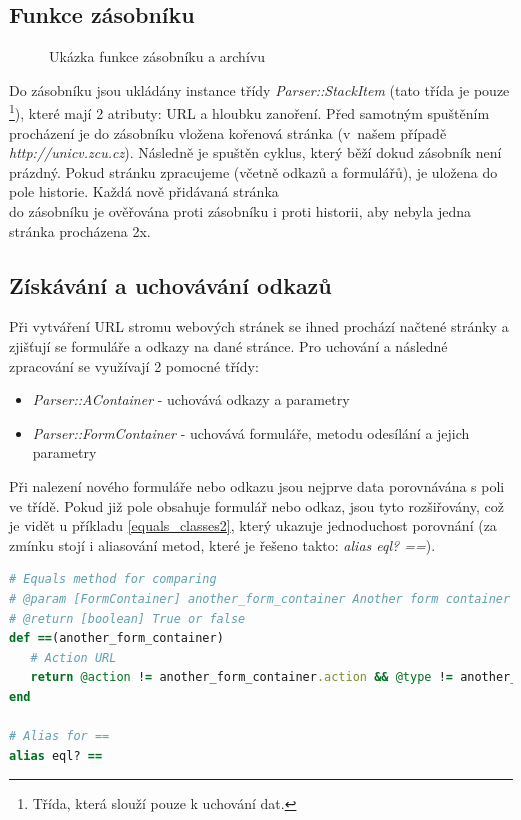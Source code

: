 \subsection{Funkce zásobníku}
\begin{figure}[h!]
\caption{Ukázka funkce zásobníku a archívu}
\label{obr.url_tree}
\end{figure}
Do zásobníku jsou ukládány instance třídy \textit{Parser::StackItem} (tato třída je pouze \footnote{Třída, která slouží pouze k uchování dat.}), které mají 2 atributy: URL a hloubku zanoření. Před samotným spuštěním procházení je do zásobníku vložena kořenová stránka (v~našem případě \textit{http://unicv.zcu.cz}). Následně je spuštěn cyklus, který běží dokud zásobník není prázdný. Pokud stránku zpracujeme (včetně odkazů a formulářů), je uložena do pole historie. Každá nově přidávaná stránka \\do zásobníku je ověřována proti zásobníku i proti historii, aby nebyla jedna stránka procházena 2x.

\subsection{Získávání a uchovávání odkazů}
Při vytváření URL stromu webových stránek se ihned prochází načtené stránky a zjišťují se formuláře a odkazy na dané stránce. Pro uchování a následné zpracování se využívají 2 pomocné třídy:
\begin{itemize}
\item \textit{Parser::AContainer} - uchovává odkazy a parametry
\item \textit{Parser::FormContainer} - uchovává formuláře, metodu odesílání a jejich parametry
\end{itemize}
Při nalezení nového formuláře nebo odkazu jsou nejprve data porovnávána s poli ve třídě. Pokud již pole obsahuje formulář nebo odkaz, jsou tyto rozšiřovány, což je vidět u příkladu \ref{equals_classes2}, který ukazuje jednoduchost porovnání (za zmínku stojí i aliasování metod, které je řešeno takto: \textit{alias eql? ==}).

\begin{lstlisting}[label=equals_classes2,language=Ruby, caption=Porovnání dvou instancí třídy FormContainer]
# Equals method for comparing
# @param [FormContainer] another_form_container Another form container
# @return [boolean] True or false
def ==(another_form_container)
   # Action URL
   return @action != another_form_container.action && @type != another_form_container.type &&  @params != another_form_container.params
end

# Alias for ==
alias eql? ==
\end{lstlisting}

